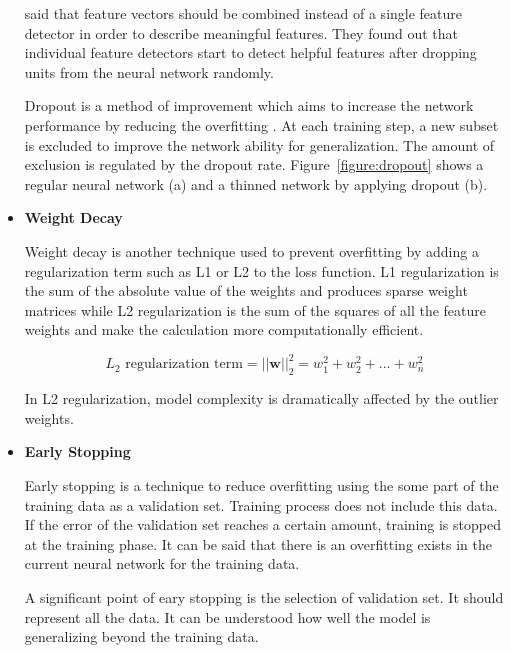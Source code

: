 \begin{itemize}
                \citet{srivastava2014dropout} said that feature vectors should be combined instead of a single feature detector in order to describe meaningful features.
                They found out that individual feature detectors start to detect helpful features after dropping units from the neural network randomly.

                

                Dropout is a method of improvement which aims to increase the network performance by reducing the overfitting \cite{srivastava2014dropout}.
                At each training step, a new subset is excluded to improve the network ability for generalization.
                The amount of exclusion is regulated by the dropout rate.
                Figure~\ref{figure:dropout} shows a regular neural network (a) and a thinned network by applying dropout (b).

            \item \textbf{Weight Decay}

                Weight decay is another technique used to prevent overfitting by adding a regularization term such as L1 or L2 to the loss function.
                L1 regularization is the sum of the absolute value of the weights and produces sparse weight matrices while L2 regularization is the sum of the squares of all the feature weights and make the calculation more computationally efficient.

                $$L_2\text{ regularization term} = ||\boldsymbol w||_2^2 = {w_1^2 + w_2^2 + ... + w_n^2}$$

                In L2 regularization, model complexity is dramatically affected by the outlier weights.

            \item \textbf{Early Stopping}

                Early stopping is a technique to reduce overfitting using the some part of the training data as a validation set.
                Training process does not include this data.
                If the error of the validation set reaches a certain amount, training is stopped at the training phase.
                It can be said that there is an overfitting exists in the current neural network for the training data.

                A significant point of eary stopping is the selection of validation set.
                It should represent all the data. It can be understood how well the model is generalizing beyond the training data.

        \end{itemize}

